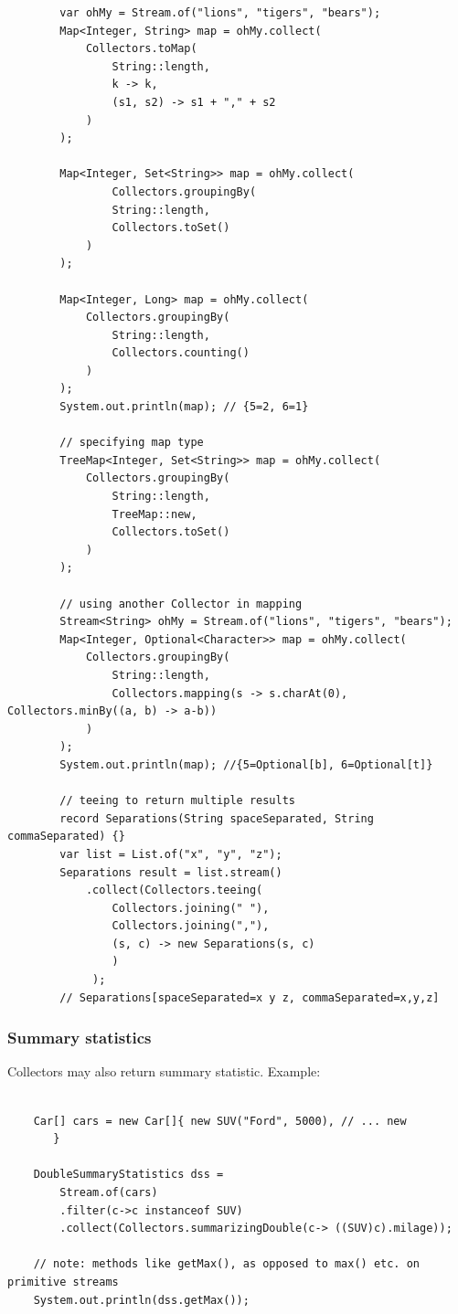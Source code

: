 \documentclass{scrartcl}
\begin{document}
    \begin{lstlisting}
        var ohMy = Stream.of("lions", "tigers", "bears");
        Map<Integer, String> map = ohMy.collect(
            Collectors.toMap(
                String::length,
                k -> k,
                (s1, s2) -> s1 + "," + s2
            )
        );

        Map<Integer, Set<String>> map = ohMy.collect(
                Collectors.groupingBy(
                String::length,
                Collectors.toSet()
            )
        );

        Map<Integer, Long> map = ohMy.collect(
            Collectors.groupingBy(
                String::length,
                Collectors.counting()
            )
        );
        System.out.println(map); // {5=2, 6=1}

        // specifying map type
        TreeMap<Integer, Set<String>> map = ohMy.collect(
            Collectors.groupingBy(
                String::length,
                TreeMap::new,
                Collectors.toSet()
            )
        );

        // using another Collector in mapping
        Stream<String> ohMy = Stream.of("lions", "tigers", "bears");
        Map<Integer, Optional<Character>> map = ohMy.collect(
            Collectors.groupingBy(
                String::length,
                Collectors.mapping(s -> s.charAt(0), Collectors.minBy((a, b) -> a-b))
            )
        );
        System.out.println(map); //{5=Optional[b], 6=Optional[t]}

        // teeing to return multiple results
        record Separations(String spaceSeparated, String commaSeparated) {}
        var list = List.of("x", "y", "z");
        Separations result = list.stream()
            .collect(Collectors.teeing(
                Collectors.joining(" "),
                Collectors.joining(","),
                (s, c) -> new Separations(s, c)
                )
             );
        // Separations[spaceSeparated=x y z, commaSeparated=x,y,z]

    \end{lstlisting}

\subsubsection{Summary statistics}

Collectors may also return summary statistic. Example:

\begin{lstlisting}

    Car[] cars = new Car[]{ new SUV("Ford", 5000), // ... new
       }

    DoubleSummaryStatistics dss =
        Stream.of(cars)
        .filter(c->c instanceof SUV)
        .collect(Collectors.summarizingDouble(c-> ((SUV)c).milage));

    // note: methods like getMax(), as opposed to max() etc. on primitive streams
    System.out.println(dss.getMax());

\end{lstlisting}
\end{document}
